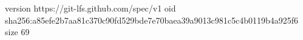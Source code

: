 version https://git-lfs.github.com/spec/v1
oid sha256:a85efe2b7aa81c370c90fd529bde7e70baea39a9013c981c5c4b0119b4a925f6
size 69
